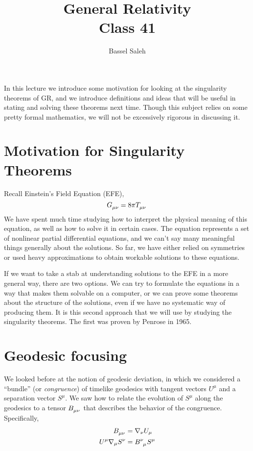 \documentclass[10pt]{article}
\title{{\Huge General Relativity}\\{\Large{Class 41}}} %
\author{Bassel Saleh}
\begin{document}
    \maketitle
    \flushbottom
    \newpage
    \pagestyle{fancynotes}
	In this lecture we introduce some motivation for looking at the singularity theorems of GR, and we introduce definitions and ideas that will be useful in stating and solving these theorems next time. Though this subject relies on some pretty formal mathematics, we will not be excessively rigorous in discussing it.
              	\section{Motivation for Singularity Theorems}\label{sec:class_style}
              	Recall Einstein's Field Equation (EFE),
              	\begin{equation}
              	    \tensor{G}{_\mu_\nu} = 8\pi\tensor{T}{_\mu_\nu}
              	\end{equation}
              	We have spent much time studying how to interpret the physical meaning of this equation, as well as how to solve it in certain cases. The equation represents a set of nonlinear partial differential equations, and we can't say many meaningful things generally about the solutions. So far, we have either relied on symmetries or used heavy approximations to obtain workable solutions to these equations.
              	
              	\par If we want to take a stab at understanding solutions to the EFE in a more general way, there are two options. We can try to formulate the equations in a way that makes them solvable on a computer, or we can prove some theorems about the structure of the solutions, even if we have no systematic way of producing them. It is this second approach that we will use by studying the singularity theorems. The first was proven by Penrose in 1965.
              	  
               	\section{Geodesic focusing}\label{sec:useful_pkg}
               		We looked before at the notion of geodesic deviation, in which we considered a ``bundle'' (or \textit{congruence}) of timelike geodesics with tangent vectors $U^\mu$ and a separation vector $S^\mu$.  We saw how to relate the evolution of $S^\mu$ along the geodesics to a tensor $\tensor{B}{_\mu_\nu}$ that describes the behavior of the congruence. Specifically,
               		\begin{align}
               		    \tensor{B}{_\mu_\nu} &= \nabla_\nu U_\mu\\
               		    U^\mu\nabla_\mu S^\nu &= \tensor{B}{^\nu_\mu}S^\mu
               		\end{align}
               		
\end{document}
